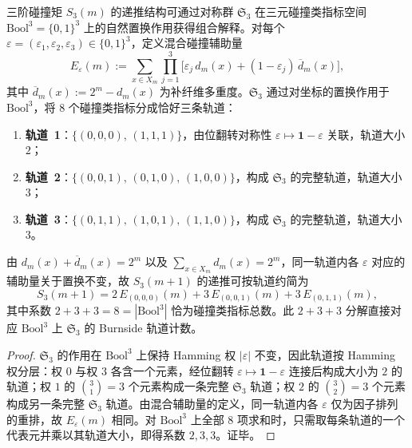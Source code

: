 \begin{proposition}\label{prop:pom-s3-orbit-decomposition}
三阶碰撞矩 $S_3(m)$ 的递推结构可通过对称群 $\mathfrak{S}_3$ 在三元碰撞类指标空间 $\mathrm{Bool}^3=\{0,1\}^3$ 上的自然置换作用获得组合解释。对每个 $\varepsilon=(\varepsilon_1,\varepsilon_2,\varepsilon_3)\in\{0,1\}^3$，定义混合碰撞辅助量
$$
E_\varepsilon(m):=\sum_{x\in X_m}\prod_{j=1}^{3}\bigl[\varepsilon_j\,d_m(x)+(1-\varepsilon_j)\,\overline{d}_m(x)\bigr],
$$
其中 $\overline{d}_m(x):=2^m-d_m(x)$ 为补纤维多重度。$\mathfrak{S}_3$ 通过对坐标的置换作用于 $\mathrm{Bool}^3$，将 $8$ 个碰撞类指标分成恰好三条轨道：
\begin{enumerate}
  \item \textbf{轨道~1}：$\{(0,0,0),\,(1,1,1)\}$，由位翻转对称性 $\varepsilon\mapsto\mathbf{1}-\varepsilon$ 关联，轨道大小 $2$；
  \item \textbf{轨道~2}：$\{(0,0,1),\,(0,1,0),\,(1,0,0)\}$，构成 $\mathfrak{S}_3$ 的完整轨道，轨道大小 $3$；
  \item \textbf{轨道~3}：$\{(0,1,1),\,(1,0,1),\,(1,1,0)\}$，构成 $\mathfrak{S}_3$ 的完整轨道，轨道大小 $3$。
\end{enumerate}
由 $d_m(x)+\overline{d}_m(x)=2^m$ 以及 $\sum_{x\in X_m}d_m(x)=2^m$，同一轨道内各 $\varepsilon$ 对应的辅助量关于置换不变，故 $S_3(m+1)$ 的递推可按轨道约简为
$$
S_3(m+1)=2\,E_{(0,0,0)}(m)+3\,E_{(0,0,1)}(m)+3\,E_{(0,1,1)}(m),
$$
其中系数 $2+3+3=8=|\mathrm{Bool}^3|$ 恰为碰撞类指标总数。此 $2{+}3{+}3$ 分解直接对应 $\mathrm{Bool}^3$ 上 $\mathfrak{S}_3$ 的 Burnside 轨道计数。
\end{proposition}
\begin{proof}
$\mathfrak{S}_3$ 的作用在 $\mathrm{Bool}^3$ 上保持 Hamming 权 $|\varepsilon|$ 不变，因此轨道按 Hamming 权分层：权 $0$ 与权 $3$ 各含一个元素，经位翻转 $\varepsilon\mapsto\mathbf{1}-\varepsilon$ 连接后构成大小为 $2$ 的轨道；权 $1$ 的 $\binom{3}{1}=3$ 个元素构成一条完整 $\mathfrak{S}_3$ 轨道；权 $2$ 的 $\binom{3}{2}=3$ 个元素构成另一条完整 $\mathfrak{S}_3$ 轨道。由混合辅助量的定义，同一轨道内各 $\varepsilon$ 仅为因子排列的重排，故 $E_\varepsilon(m)$ 相同。对 $\mathrm{Bool}^3$ 上全部 $8$ 项求和时，只需取每条轨道的一个代表元并乘以其轨道大小，即得系数 $2,3,3$。证毕。
\end{proof}

